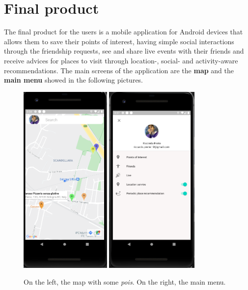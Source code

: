 \documentclass[../main]{subfiles}
\begin{document}
\section{Final product}
\label{s:app}

The final product for the users is a mobile application for Android devices that allows them to save their points of interest, having simple social interactions 
through the friendship requests, see and share live events with their friends and receive advices for places to visit through location-, social- and activity-aware recommendations.
The main screens of the application are the \textbf{map} and the \textbf{main menu} showed in the following pictures.
\begin{figure}[H]
    \centering
    \includegraphics[width=0.4\textwidth]{images/app/app_overview}
    \includegraphics[width=0.41\textwidth]{images/app/main_menu}
    \caption{On the left, the map with some \textit{pois}. On the right, the main menu.}
\end{figure}






\end{document}

